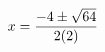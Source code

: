 \documentclass[preview]{standalone}
\begin{document}
\begin{align*}
\special{dvisvgm:raw <g id='unique000'>}x=\frac{-4\pm\sqrt{64}}{2(2)}\special{dvisvgm:raw </g>}
\end{align*}
\end{document}

